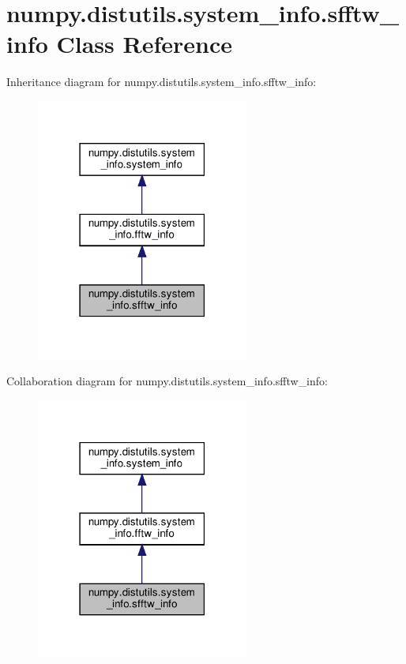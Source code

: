 \hypertarget{classnumpy_1_1distutils_1_1system__info_1_1sfftw__info}{}\section{numpy.\+distutils.\+system\+\_\+info.\+sfftw\+\_\+info Class Reference}
\label{classnumpy_1_1distutils_1_1system__info_1_1sfftw__info}


Inheritance diagram for numpy.\+distutils.\+system\+\_\+info.\+sfftw\+\_\+info\+:
\nopagebreak
\begin{figure}[H]
\begin{center}
\leavevmode
\includegraphics[width=198pt]{classnumpy_1_1distutils_1_1system__info_1_1sfftw__info__inherit__graph}
\end{center}
\end{figure}


Collaboration diagram for numpy.\+distutils.\+system\+\_\+info.\+sfftw\+\_\+info\+:
\nopagebreak
\begin{figure}[H]
\begin{center}
\leavevmode
\includegraphics[width=198pt]{classnumpy_1_1distutils_1_1system__info_1_1sfftw__info__coll__graph}
\end{center}
\end{figure}

